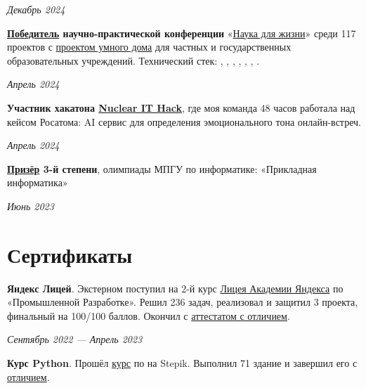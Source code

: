 \documentclass[margin,line]{resume}
\begin{document}
\begin{resume}
  \vspace{-6mm}

  \hfill \textsl{Декабрь 2024}

  \textbf{\href{https://alchemmist.github.io/CV/attachments/scince-for-life-win.pdf}{Победитель}
  научно-практической конференции}
  «\href{https://conf.profil.mos.ru/academ}{Наука для
  жизни}» среди 117 проектов с
  \href{https://github.com/smart-cab/}{проектом умного
  дома} для частных и государственных
  образовательных учреждений. Технический стек: ,
  , , ,
  , , .
  \vspace{-6mm}

  \hfill \textsl{Апрель 2024}

  \vspace{-2mm}
  \textbf{Участник хакатона \href{https://nuclearhack.mephi.ru/}{Nuclear
  IT Hack}}, где моя команда 48 часов работала
  над кейсом Росатома: AI сервис для определения эмоционального тона
  онлайн-встреч.

  \vspace{-7mm}

  \hfill \textsl{Апрель 2024}

  \textbf{\href{https://alchemmist.github.io/CV/attachments/informatics-olimpic.pdf}{Призёр}
  3-й степени}, олимпиады МПГУ по информатике:
  «Прикладная информатика»
  \vspace{-2mm}

  \hfill \textsl{Июнь 2023}

  \section{\mysidestyle Сертификаты}
  \textbf{Яндекс Лицей}. Экстерном поступил на 2-й курс
  \href{https://lyceum.yandex.ru/}{Лицея
  Академии Яндекса} по «Промышленной Разработке». Решил 236 задач,
  реализовал и защитил 3 проекта, финальный на 100/100 баллов. Окончил с
  \href{https://alchemmist.github.io/CV/attachments/yandex-lyceum.pdf}{аттестатом
  с отличием}.

  \vspace{-6mm}

  \hfill \textsl{Сентябрь 2022 — Апрель 2023}

  \textbf{Курс Python}. Прошёл
  \href{https://stepik.org/course/67}{курс} по  на
  Stepik. Выполнил 71
  здание и завершил его с
  \href{https://alchemmist.github.io/CV/attachments/stepik-python-course.pdf}{отличием}.


\end{resume}
\end{document}
